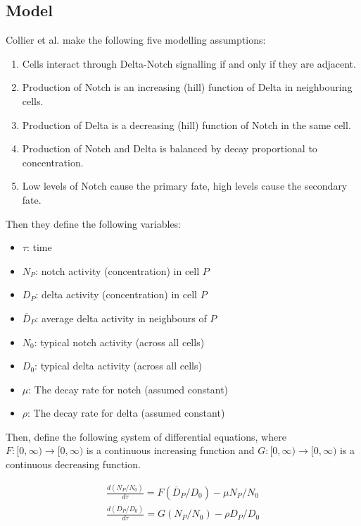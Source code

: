 \documentclass{article}
\begin{document}
\begin{flushleft}
\medskip

\subsection{Model}

Collier et al. make the following five modelling assumptions:
\begin{enumerate}
  \item Cells interact through Delta-Notch signalling if and only if they are adjacent.
  \item Production of Notch is an increasing (hill) function of Delta in neighbouring cells.
  \item Production of Delta is a decreasing (hill) function of Notch in the same cell.
  \item Production of Notch and Delta is balanced by decay proportional to concentration.
  \item Low levels of Notch cause the primary fate, high levels cause the secondary fate.
\end{enumerate}

Then they define the following variables:

\begin{itemize}
  \item $\tau$: time
  \item $N_{P}$: notch activity (concentration) in cell $P$
  \item $D_{P}$: delta activity (concentration) in cell $P$
  \item $\overline{D}_{P}$: average delta activity in neighbours of $P$
  \item $N_{0}$: typical notch activity (across all cells)
  \item $D_{0}$: typical delta activity (across all cells)
  \item $\mu$: The decay rate for notch (assumed constant)
  \item $\rho$: The decay rate for delta (assumed constant)
\end{itemize}

Then, define the following system of differential equations, where $F:[0, \infty) \rightarrow [0, \infty)$ is a continuous increasing function and $G: [0, \infty)\rightarrow [0, \infty)$ is a continuous decreasing function.

$$
\begin{aligned}
  \frac{d(N_{P} / N_{0})}{d\tau} = F(\overline{D}_{P} / D_{0}) - \mu N_{P} / N_{0} \\[5pt]
  \frac{d(D_{P} / D_{0})}{d\tau} = G(N_{P} / N_{0}) - \rho D_{P} / D_{0}
\end{aligned}
$$


\end{flushleft}
\end{document}
